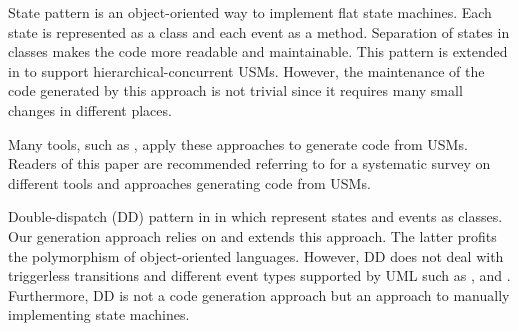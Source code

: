 State pattern \cite{Shalyto2006,Douglass1999} is an object-oriented way to implement flat state machines. Each state is represented as a class and each event as a method. %
Separation of states in classes makes the code more readable and maintainable. %
This pattern is extended in \cite{niaz_mapping_2004} to support hierarchical-concurrent USMs. However, the maintenance of the code generated by this approach is not trivial since it requires many small changes in different places. %

Many tools, such as \cite{ibm_rhapsody, sparxsystems_enterprise_2014}, apply these approaches to generate code from USMs. Readers of this paper are recommended referring to \cite{Domnguez2012} for a systematic survey on different tools and approaches generating code from USMs.

Double-dispatch (DD) pattern in \cite{spinke_object-oriented_2013} in which %
represent states and events as classes. Our generation approach relies on and extends this approach. The latter profits the polymorphism of object-oriented languages. %
However, DD does not deal with triggerless transitions and different event types supported by UML such as ,  and . Furthermore, DD is not a code generation approach but an approach to manually implementing state machines.